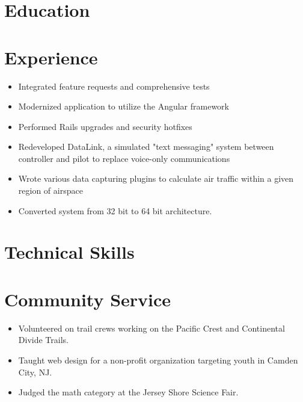\documentclass[10.5pt,a4paper,sans]{moderncv}        %
\begin{document}
\makecvtitle

\section{Education}


\section{Experience}

\begin{itemize}
\item Integrated feature requests and comprehensive tests
\item Modernized application to utilize the Angular framework
\item Performed Rails upgrades and security hotfixes
\end{itemize}


\begin{itemize}
\item Redeveloped DataLink, a simulated "text messaging" system between controller and pilot to replace voice-only communications
\item Wrote various data capturing plugins to calculate air traffic within a given region of airspace
\item Converted system from 32 bit to 64 bit architecture.
\end{itemize}

\section{Technical Skills}

\section{Community Service}
\begin{itemize}
  \item Volunteered on trail crews working on the Pacific Crest and Continental Divide Trails.
  \item Taught web design for a non-profit organization targeting youth in Camden City, NJ.
  \item Judged the math category at the Jersey Shore Science Fair.
\end{itemize}
\end{document}
